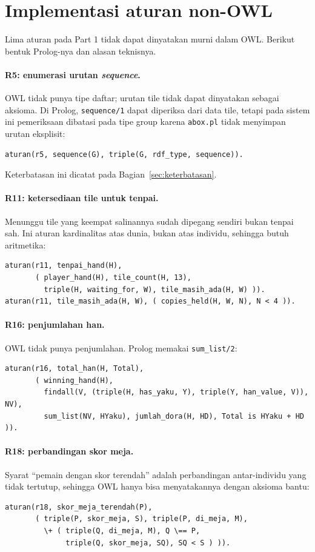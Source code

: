 \documentclass[11pt,a4paper]{article}
\newcommand{\code}[1]{\texttt{#1}}
\begin{document}
\section{Implementasi aturan non-OWL}

Lima aturan pada Part 1 tidak dapat dinyatakan murni dalam OWL. Berikut bentuk Prolog-nya
dan alasan teknisnya.

\paragraph{R5: enumerasi urutan \textit{sequence}.}
OWL tidak punya tipe daftar; urutan tile tidak dapat dinyatakan sebagai aksioma. Di Prolog,
\code{sequence/1} dapat diperiksa dari data tile, tetapi pada sistem ini pemeriksaan dibatasi
pada tipe group karena \code{abox.pl} tidak menyimpan urutan eksplisit:
\begin{lstlisting}
aturan(r5, sequence(G), triple(G, rdf_type, sequence)).
\end{lstlisting}
Keterbatasan ini dicatat pada Bagian~\ref{sec:keterbatasan}.

\paragraph{R11: ketersediaan tile untuk tenpai.}
Menunggu tile yang keempat salinannya sudah dipegang sendiri bukan tenpai sah. Ini aturan
kardinalitas atas dunia, bukan atas individu, sehingga butuh aritmetika:
\begin{lstlisting}
aturan(r11, tenpai_hand(H),
       ( player_hand(H), tile_count(H, 13),
         triple(H, waiting_for, W), tile_masih_ada(H, W) )).
aturan(r11, tile_masih_ada(H, W), ( copies_held(H, W, N), N < 4 )).
\end{lstlisting}

\paragraph{R16: penjumlahan han.}
OWL tidak punya penjumlahan. Prolog memakai \code{sum_list/2}:
\begin{lstlisting}
aturan(r16, total_han(H, Total),
       ( winning_hand(H),
         findall(V, (triple(H, has_yaku, Y), triple(Y, han_value, V)), NV),
         sum_list(NV, HYaku), jumlah_dora(H, HD), Total is HYaku + HD )).
\end{lstlisting}

\paragraph{R18: perbandingan skor meja.}
Syarat ``pemain dengan skor terendah'' adalah perbandingan antar-individu yang tidak
tertutup, sehingga OWL hanya bisa menyatakannya dengan aksioma bantu:
\begin{lstlisting}
aturan(r18, skor_meja_terendah(P),
       ( triple(P, skor_meja, S), triple(P, di_meja, M),
         \+ ( triple(Q, di_meja, M), Q \== P,
              triple(Q, skor_meja, SQ), SQ < S ) )).
\end{lstlisting}
\end{document}

